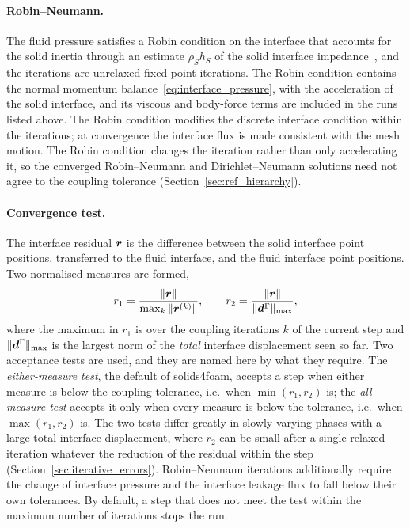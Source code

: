 \paragraph{Robin--Neumann.}
The fluid pressure satisfies a Robin condition on the interface that accounts for the solid inertia through an estimate $\rho_S h_S$ of the solid interface impedance~\citep{BadiaNobile2008, Tukovic2018b}, and the iterations are unrelaxed fixed-point iterations.
The Robin condition contains the normal momentum balance~\eqref{eq:interface_pressure}, with the acceleration of the solid interface, and its viscous and body-force terms are included in the runs listed above.
The Robin condition modifies the discrete interface condition within the iterations; at convergence the interface flux is made consistent with the mesh motion.
The Robin condition changes the iteration rather than only accelerating it, so the converged Robin--Neumann and Dirichlet--Neumann solutions need not agree to the coupling tolerance (Section~\ref{sec:ref_hierarchy}).

\paragraph{Convergence test.}
The interface residual $\boldsymbol{r}$ is the difference between the solid interface point positions, transferred to the fluid interface, and the fluid interface point positions.
Two normalised measures are formed,
\begin{equation}
	r_1 = \frac{\|\boldsymbol{r}\|}{\max_k \|\boldsymbol{r}^{(k)}\|},
	\qquad
	r_2 = \frac{\|\boldsymbol{r}\|}{\|\boldsymbol{d}^\Gamma\|_{\max}},
	\label{eq:coupling_residuals}
\end{equation}
where the maximum in $r_1$ is over the coupling iterations $k$ of the current step and $\|\boldsymbol{d}^\Gamma\|_{\max}$ is the largest norm of the \emph{total} interface displacement seen so far.
Two acceptance tests are used, and they are named here by what they require.
The \emph{either-measure test}, the default of solids4foam, accepts a step when either measure is below the coupling tolerance, i.e.\ when $\min(r_1, r_2)$ is; the \emph{all-measure test} accepts it only when every measure is below the tolerance, i.e.\ when $\max(r_1, r_2)$ is.
The two tests differ greatly in slowly varying phases with a large total interface displacement, where $r_2$ can be small after a single relaxed iteration whatever the reduction of the residual within the step (Section~\ref{sec:iterative_errors}).
Robin--Neumann iterations additionally require the change of interface pressure and the interface leakage flux to fall below their own tolerances.
By default, a step that does not meet the test within the maximum number of iterations stops the run.

